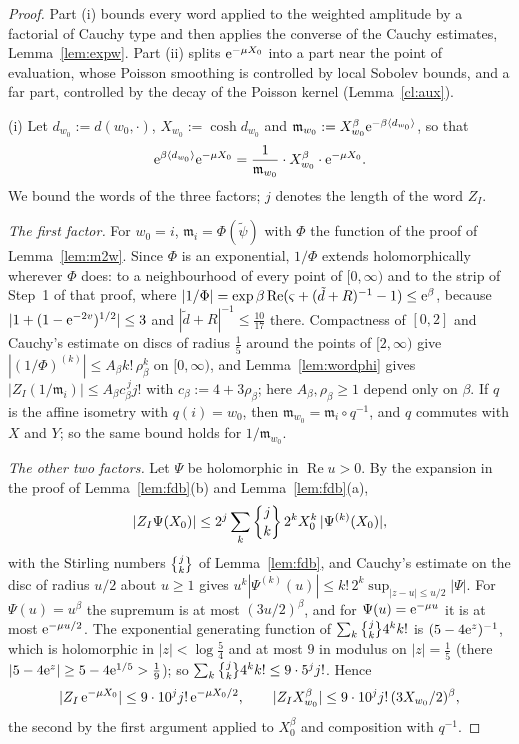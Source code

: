 \begin{proof}
Part (i) bounds every word applied to the weighted amplitude by a factorial of Cauchy type and then applies the converse
of the Cauchy estimates, Lemma~\ref{lem:expw}. Part (ii) splits $\mathrm{e}^{-\mu X_0}$ into a part near the point of evaluation, whose Poisson smoothing is
controlled by local Sobolev bounds, and a far part, controlled by the decay of the Poisson kernel (Lemma~\ref{cl:aux}).

(i) Let $d_{w_0}:=d(w_0,\cdot)$, $X_{w_0}:=\cosh d_{w_0}$ and $\mathfrak m_{w_0}:=X_{w_0}^\beta\mathrm{e}^{-\beta\langle d_{w_0}\rangle}$, so that
\[
\mathrm{e}^{\beta\langle d_{w_0}\rangle}\mathrm{e}^{-\mu X_0}=\frac1{\mathfrak m_{w_0}}\cdot X_{w_0}^\beta\cdot\mathrm{e}^{-\mu X_0}.
\]
We bound the words of the three factors; $j$ denotes the length of the word $Z_I$.

\emph{The first factor.} For $w_0=i$, $\mathfrak m_i=\Phi(\tilde\psi)$ with $\Phi$ the function of the proof of Lemma~\ref{lem:m2w}.
Since $\Phi$ is an exponential, $1/\Phi$ extends holomorphically wherever $\Phi$ does: to a neighbourhood of every point of $[0,\infty)$
and to the strip of Step~1 of that proof, where $|1/\Phi|=\exp\beta\operatorname{Re}(\varsigma+(\tilde d+R)^{-1}-1)\le\mathrm{e}^{\beta}$,
because $|1+(1-\mathrm{e}^{-2v})^{1/2}|\le3$ and $|\tilde d+R|^{-1}\le\tfrac{10}{17}$ there. Compactness of $[0,2]$ and Cauchy's estimate on
discs of radius $\tfrac15$ around the points of $[2,\infty)$ give $|(1/\Phi)^{(k)}|\le A_\beta k!\,\rho_\beta^k$ on $[0,\infty)$, and
Lemma~\ref{lem:wordphi} gives $|Z_I(1/\mathfrak m_i)|\le A_\beta c_\beta^{\,j}j!$ with $c_\beta:=4+3\rho_\beta$; here $A_\beta,\rho_\beta\ge1$
depend only on $\beta$. If $q$ is the affine isometry with $q(i)=w_0$, then
$\mathfrak m_{w_0}=\mathfrak m_i\circ q^{-1}$, and $q$ commutes with $X$ and $Y$; so the same bound holds for $1/\mathfrak m_{w_0}$.

\emph{The other two factors.} Let $\Psi$ be holomorphic in $\operatorname{Re}u>0$. By the expansion in the proof of Lemma~\ref{lem:fdb}(b) and
Lemma~\ref{lem:fdb}(a),
\[
|Z_I\Psi(X_0)|\le2^j\sum_k\stirling jk\,2^kX_0^k\,|\Psi^{(k)}(X_0)| ,
\]
with the Stirling numbers $\stirling jk$ of Lemma~\ref{lem:fdb}, and Cauchy's estimate on the disc of radius $u/2$ about $u\ge1$ gives
$u^k|\Psi^{(k)}(u)|\le k!\,2^k\sup_{|z-u|\le u/2}|\Psi|$. For $\Psi(u)=u^\beta$ the supremum is at most $(3u/2)^\beta$, and for
$\Psi(u)=\mathrm{e}^{-\mu u}$ it is at most $\mathrm{e}^{-\mu u/2}$. The exponential generating function of $\sum_k\stirling jk4^kk!$ is $(5-4\mathrm{e}^z)^{-1}$, which is
holomorphic in $|z|<\log\tfrac54$ and at most $9$ in modulus on $|z|=\tfrac15$ (there $|5-4\mathrm{e}^z|\ge5-4\mathrm{e}^{1/5}>\tfrac19$); so
$\sum_k\stirling jk4^kk!\le9\cdot5^jj!$. Hence
\[
|Z_I\,\mathrm{e}^{-\mu X_0}|\le9\cdot10^jj!\,\mathrm{e}^{-\mu X_0/2},\qquad|Z_IX_{w_0}^\beta|\le9\cdot10^jj!\,(3X_{w_0}/2)^\beta ,
\]
the second by the first argument applied to $X_0^\beta$ and composition with $q^{-1}$.


\end{proof}
